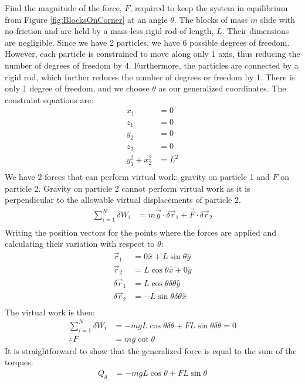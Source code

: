 \begin{example}{0pt}{Find the magnitude of the force, $F$, required to keep the system in equilibrium from Figure \ref{fig:BlocksOnCorner} at an angle $\theta$. The blocks of mass $m$ slide with no friction and are held by a mass-less rigid rod of length, $L$. Their dimensions are negligible.}{}
Since we have 2 particles, we have 6 possible degrees of freedom. However, each particle is constrained to move along only 1 axis, thus reducing the number of degrees of freedom by 4. Furthermore, the particles are connected by a rigid rod, which further reduces the number of degrees or freedom by 1. There is only 1 degree of freedom, and we choose $\theta$ as our generalized coordinates. The constraint equations are:
\begin{align*}
x_1&=0\nonumber\\
z_1&=0\nonumber\\
y_2&=0\nonumber\\
z_2&=0\nonumber\\
y_1^2+x_2^2&=L^2\\
\end{align*}
We have 2 forces that can perform virtual work: gravity on particle 1 and $F$ on particle 2. Gravity on particle 2 cannot perform virtual work as it is perpendicular to the allowable virtual displacements of particle 2.
\begin{align*}
\sum_{i=1}^N\delta W_i &= m\vec{g}\cdot\delta\vec{r}_1+\vec{F}\cdot\delta\vec{r}_2\\
\end{align*}
Writing the position vectors for the points where the forces are applied and calculating their variation with respect to $\theta$:
\begin{align*}
\vec{r}_1&=0\hat{x}+L\sin{\theta}\hat{y}\\
\vec{r}_2&=L\cos{\theta}\hat{x}+0\hat{y}\\
\delta\vec{r}_1&=L\cos{\theta}\delta\theta\hat{y}\\
\delta\vec{r}_2&=-L\sin{\theta}\delta\theta\hat{x} \\
\end{align*}
The virtual work is then:
\begin{align*}
\sum_{i=1}^N\delta W_i &= -mgL\cos{\theta}\delta \theta + FL\sin{\theta}\delta \theta=0 \\
\therefore F&=mg\cot{\theta}
\end{align*}
It is straightforward to show that the generalized force is equal to the sum of the torques:
\begin{align*}
Q_\theta &= -mgL\cos{\theta}+FL\sin{\theta}\\
\end{align*}
\end{example}

